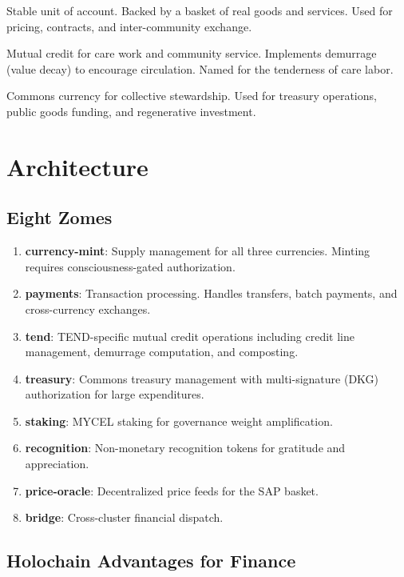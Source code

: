 \documentclass[11pt,twocolumn]{article}
\begin{document}
\begin{description}[nosep]
  \item[SAP (Sapience)] Stable unit of account. Backed by a basket of real
    goods and services. Used for pricing, contracts, and inter-community exchange.
  \item[TEND (Tenderness)] Mutual credit for care work and community service.
    Implements demurrage (value decay) to encourage circulation. Named for the
    tenderness of care labor.
  \item[MYCEL (Mycelium)] Commons currency for collective stewardship.
    Used for treasury operations, public goods funding, and regenerative
    investment.
\end{description}

\section{Architecture}

\subsection{Eight Zomes}

\begin{enumerate}[nosep]
  \item \textbf{currency-mint}: Supply management for all three currencies.
    Minting requires consciousness-gated authorization.
  \item \textbf{payments}: Transaction processing. Handles transfers, batch
    payments, and cross-currency exchanges.
  \item \textbf{tend}: TEND-specific mutual credit operations including
    credit line management, demurrage computation, and composting.
  \item \textbf{treasury}: Commons treasury management with multi-signature
    (DKG) authorization for large expenditures.
  \item \textbf{staking}: MYCEL staking for governance weight amplification.
  \item \textbf{recognition}: Non-monetary recognition tokens for gratitude
    and appreciation.
  \item \textbf{price-oracle}: Decentralized price feeds for the SAP basket.
  \item \textbf{bridge}: Cross-cluster financial dispatch.
\end{enumerate}

\subsection{Holochain Advantages for Finance}
\end{document}

